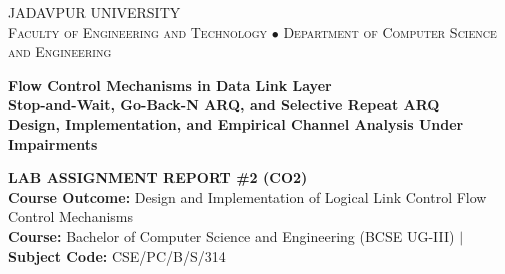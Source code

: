 \documentclass[11pt,a4paper]{article}
\begin{document}
\hypersetup{pageanchor=false}
\begin{titlepage}
\thispagestyle{empty}
\centering

\vspace*{0.2cm}
{\scshape\LARGE JADAVPUR UNIVERSITY}\\[0.2cm]
{\scshape\normalsize Faculty of Engineering and Technology $\bullet$ Department of Computer Science and Engineering}\\[0.35cm]


\vspace{0.6cm}
{\color{navyblue}\LARGE\bfseries Flow Control Mechanisms in Data Link Layer}\\[0.25cm]
{\color{navyblue!85}\large\bfseries Stop-and-Wait, Go-Back-N ARQ, and Selective Repeat ARQ}\\[0.2cm]
{\color{deepgold}\normalsize\textbf{Design, Implementation, and Empirical Channel Analysis Under Impairments}}\\[0.45cm]

\begin{tcolorbox}[
    enhanced,
    colback=softblue!30,
    colframe=navyblue,
    boxrule=1pt,
    arc=2mm,
    width=0.92\textwidth,
    left=12pt, right=12pt, top=8pt, bottom=8pt,
    halign=center
]
    \textbf{\color{navyblue}\normalsize LAB ASSIGNMENT REPORT \#2 (CO2)}\\[0.15cm]
    {\small\textbf{Course Outcome:} Design and Implementation of Logical Link Control Flow Control Mechanisms}\\[0.1cm]
    {\footnotesize\textbf{Course:} Bachelor of Computer Science and Engineering (BCSE UG-III) $\vert$ \textbf{Subject Code:} CSE/PC/B/S/314}
\end{tcolorbox}

\vspace{0.5cm}


\end{titlepage}
\end{document}
